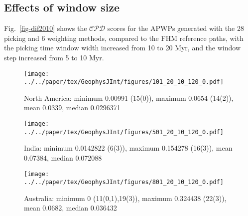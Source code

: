 \subsection{Effects of window size}

Fig.~\ref{fig-dif2010} shows the $\mathcal{CPD}$ scores for the APWPs generated
with the 28 picking and 6 weighting methods, compared to the FHM reference
paths, with the picking time window width increased from 10 to 20 Myr, and the
window step increased from 5 to 10 Myr.

\begin{figure*}
	\centering
	\begin{subfigure}{.96\textwidth}
		\texttt{[image: ../../paper/tex/GeophysJInt/figures/101\_20\_10\_120\_0.pdf]}
		\caption{North America: minimum 0.00991 (15(0)),
		maximum 0.0654 (14(2)), mean 0.0339, median 0.0296371}\label{fig-na-dif2010}
	\end{subfigure}
	\vspace{.1em}
	\begin{subfigure}{.96\textwidth}
		\texttt{[image: ../../paper/tex/GeophysJInt/figures/501\_20\_10\_120\_0.pdf]}
		\caption{India: minimum 0.0142822 (6(3)), maximum 0.154278 (16(3)),
		mean 0.07384, median 0.072088}\label{fig-in-dif2010}
	\end{subfigure}
	\vspace{.1em}
	\begin{subfigure}{.96\textwidth}
		\texttt{[image: ../../paper/tex/GeophysJInt/figures/801\_20\_10\_120\_0.pdf]}
		\caption{Australia: minimum 0 (11(0,1),19(3)), maximum
		0.324438 (22(3)), mean 0.0682, median 0.036432}\label{fig-au-dif2010}
	\end{subfigure}
	\caption[$\mathcal{CPD}$ of each plate's paleomagnetic APWPs vs its FHM
predicted APWP (20/10 Myr bin/step)]{As Fig.~\ref{fig-dif}, here the paths are
generated in 20 Myr bin and 10 Myr step. The difference values less than
one-standard-deviation interval of the whole 168 values are colored in green,
more than one-standard-deviation interval colored in red. Compare the numbers of
picked paleopoles with those in Fig.~\ref{fig-dif}.}\label{fig-dif2010}
\end{figure*}

